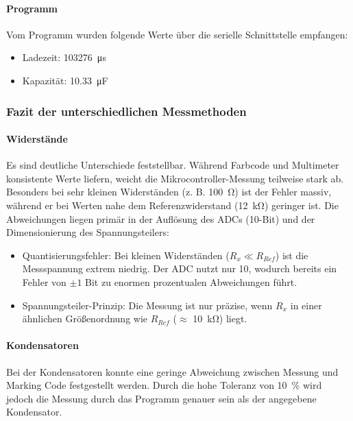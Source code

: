 \paragraph{Programm} Vom Programm wurden folgende Werte über die serielle Schnittstelle empfangen:

\begin{itemize}[noitemsep]
    \item Ladezeit: \SI{103276}{\micro\second}
    \item Kapazität: \SI{10.33}{\micro\farad}
\end{itemize}

\subsubsection{Fazit der unterschiedlichen Messmethoden}

\paragraph{Widerstände} Es sind deutliche Unterschiede feststellbar. Während Farbcode und Multimeter konsistente Werte liefern, weicht die Mikrocontroller-Messung teilweise stark ab. Besonders bei sehr kleinen Widerständen (z. B. \SI{100}{\ohm}) ist der Fehler massiv, während er bei Werten nahe dem Referenzwiderstand (\SI{12}{\kilo\ohm}) geringer ist. Die Abweichungen liegen primär in der Auflösung des ADCs (10-Bit) und der Dimensionierung des Spannungsteilers:
\begin{itemize}
    \item Quantisierungsfehler: Bei kleinen Widerständen ($R_x \ll R_{Ref}$) ist die Messspannung extrem niedrig. Der ADC nutzt nur \SI{10}{\bit}, wodurch bereits ein Fehler von $\pm 1$ Bit zu enormen prozentualen Abweichungen führt.
    \item Spannungsteiler-Prinzip: Die Messung ist nur präzise, wenn $R_x$ in einer ähnlichen Größenordnung wie $R_{Ref}$ ($\approx$ \SI{10}{\kilo\ohm}) liegt.
\end{itemize}

\paragraph{Kondensatoren} Bei der Kondensatoren konnte eine geringe Abweichung zwischen Messung und Marking Code festgestellt werden. Durch die hohe Toleranz von \SI{10}{\percent} wird jedoch die Messung durch das Programm genauer sein als der angegebene Kondensator.